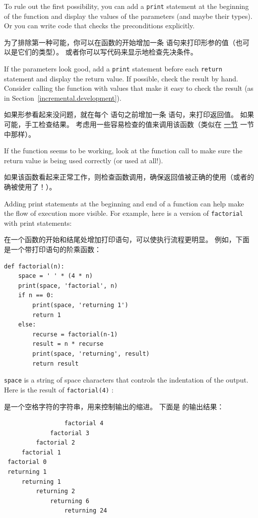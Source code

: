 To rule out the first possibility, you can add a {\tt print} statement
at the beginning of the function and display the values of the
parameters (and maybe their types).  Or you can write code
that checks the preconditions explicitly.

为了排除第一种可能，你可以在函数的开始增加一条  语句来打印形参的值（也可以是它们的类型）。
或者你可以写代码来显示地检查先决条件。
  

If the parameters look good, add a {\tt print} statement before each
{\tt return} statement and display the return value.  If
possible, check the result by hand.  Consider calling the
function with values that make it easy to check the result
(as in Section~\ref{incremental.development}).

如果形参看起来没问题，就在每个  语句之前增加一条  语句，来打印返回值。
如果可能，手工检查结果。
考虑用一些容易检查的值来调用该函数（类似在 \hyperref[incremental.development]{一节} 一节中那样）。


If the function seems to be working, look at the function call
to make sure the return value is being used correctly (or used
at all!).

如果该函数看起来正常工作，则检查函数调用，确保返回值被正确的使用（或者的确被使用了！）。

Adding print statements at the beginning and end of a function
can help make the flow of execution more visible.
For example, here is a version of {\tt factorial} with
print statements:

在一个函数的开始和结尾处增加打印语句，可以使执行流程更明显。
例如，下面是一个带打印语句的阶乘函数：

\begin{lstlisting}
def factorial(n):
    space = ' ' * (4 * n)
    print(space, 'factorial', n)
    if n == 0:
        print(space, 'returning 1')
        return 1
    else:
        recurse = factorial(n-1)
        result = n * recurse
        print(space, 'returning', result)
        return result
\end{lstlisting}

%
{\tt space} is a string of space characters that controls the
indentation of the output.  Here is the result of {\tt factorial(4)} :

 是一个空格字符的字符串，用来控制输出的缩进。 下面是  的输出结果：


\begin{lstlisting}
                 factorial 4
             factorial 3
         factorial 2
     factorial 1
 factorial 0
 returning 1
     returning 1
         returning 2
             returning 6
                 returning 24
\end{lstlisting}


